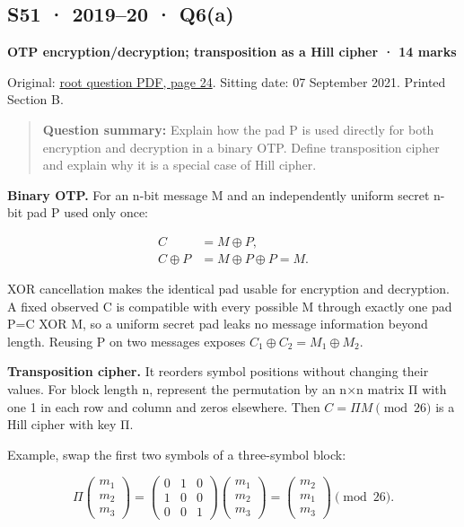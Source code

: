 \documentclass[11pt,a4paper]{article}
\begin{document}
\clearpage
\subsection{S51 · 2019–20 · Q6(a)}\label{s51}

\textbf{OTP encryption/\allowbreak{}decryption; transposition as a Hill cipher · 14 marks}


Original: \href{../../CSE405-Security_Merged.pdf\#page=24}{root question PDF,\allowbreak{} page 24}. Sitting date: 07 September 2021. Printed Section B.



\begin{quote}\small

\textbf{Question summary:} Explain how the pad P is used directly for both encryption and decryption in a binary OTP. Define transposition cipher and explain why it is a special case of Hill cipher.



\end{quote}

\textbf{Binary OTP.} For an n-bit message M and an independently uniform secret n-bit pad P used only once:



\[
\begin{aligned}C&=M\oplus P,\\C\oplus P&=M\oplus P\oplus P=M.\end{aligned}
\]

XOR cancellation makes the identical pad usable for encryption and decryption. A fixed observed C is compatible with every possible M through exactly one pad P=\allowbreak{}C XOR M,\allowbreak{} so a uniform secret pad leaks no message information beyond length. Reusing P on two messages exposes \(C_1\oplus C_2=M_1\oplus M_2\).


\textbf{Transposition cipher.} It reorders symbol positions without changing their values. For block length n,\allowbreak{} represent the permutation by an n×n matrix Π with one 1 in each row and column and zeros elsewhere. Then \(C=\Pi M\pmod{26}\) is a Hill cipher with key Π.


Example,\allowbreak{} swap the first two symbols of a three-symbol block:



\[
\Pi\begin{pmatrix}m_1\\m_2\\m_3\end{pmatrix}=\begin{pmatrix}0&1&0\\1&0&0\\0&0&1\end{pmatrix}\begin{pmatrix}m_1\\m_2\\m_3\end{pmatrix}=\begin{pmatrix}m_2\\m_1\\m_3\end{pmatrix}\pmod{26}.
\]
\end{document}
